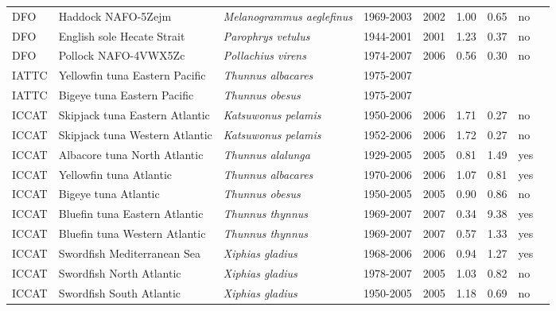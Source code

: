 \begin{longtable}{p{1.8cm}p{4cm}p{4cm}ccccp{1.9cm}c}
  DFO & Haddock NAFO-5Zejm & \textit{Melanogrammus aeglefinus} & 1969-2003 & 2002 & 1.00 & 0.65 & no & \cite{NAFO-HAD5Zejm-2003.pdf} \\ 
  DFO & English sole Hecate Strait & \textit{Parophrys vetulus} & 1944-2001 & 2001 & 1.23 & 0.37 & no & \cite{Flat99.pdf} \\ 
  DFO & Pollock NAFO-4VWX5Zc & \textit{Pollachius virens} & 1974-2007 & 2006 & 0.56 & 0.30 & no & \cite{NAFO-POLL4VWX5Zc-2006.pdf} \\ 
  IATTC & Yellowfin tuna Eastern Pacific & \textit{Thunnus albacares} & 1975-2007 &  &  &  &  & \cite{SAR8-YFT-ENG.pdf} \\ 
  IATTC & Bigeye tuna Eastern Pacific & \textit{Thunnus obesus} & 1975-2007 &  &  &  &  & \cite{JENSEN_BETEPAC_2008.pdf} \\ 
  ICCAT & Skipjack tuna Eastern Atlantic & \textit{Katsuwonus pelamis} & 1950-2006 & 2006 & 1.71 & 0.27 & no & \cite{JENSEN_YFINATL-2008.pdf} \\ 
  ICCAT & Skipjack tuna Western Atlantic & \textit{Katsuwonus pelamis} & 1952-2006 & 2006 & 1.72 & 0.27 & no & \cite{JENSEN_YFINATL-2008.pdf} \\ 
  ICCAT & Albacore tuna North Atlantic & \textit{Thunnus alalunga} & 1929-2005 & 2005 & 0.81 & 1.49 & yes & \cite{2007-ALB-STOCK-ASSESS-REP.pdf} \\ 
  ICCAT & Yellowfin tuna Atlantic & \textit{Thunnus albacares} & 1970-2006 & 2006 & 1.07 & 0.81 & yes & \cite{JENSEN-YFINATL-2008.pdf} \\ 
  ICCAT & Bigeye tuna Atlantic & \textit{Thunnus obesus} & 1950-2005 & 2005 & 0.90 & 0.86 & no & \cite{JENSEN-BIGEYEATL-2008.pdf} \\ 
  ICCAT & Bluefin tuna Eastern Atlantic & \textit{Thunnus thynnus} & 1969-2007 & 2007 & 0.34 & 9.38 & yes & \cite{ref2008-BFT-STOCK-ASSESS-REP.pdf} \\ 
  ICCAT & Bluefin tuna Western Atlantic & \textit{Thunnus thynnus} & 1969-2007 & 2007 & 0.57 & 1.33 & yes & \cite{ref2008-BFT-STOCK-ASSESS-REP.pdf} \\ 
  ICCAT & Swordfish Mediterranean Sea & \textit{Xiphias gladius} & 1968-2006 & 2006 & 0.94 & 1.27 & yes & \cite{ICCAT-Mediterranean-Xiphiasgladius-2007.pdf} \\ 
  ICCAT & Swordfish North Atlantic & \textit{Xiphias gladius} & 1978-2007 & 2005 & 1.03 & 0.82 & no & \cite{JENSEN_SWORDSATL-2007.pdf} \\ 
  ICCAT & Swordfish South Atlantic & \textit{Xiphias gladius} & 1950-2005 & 2005 & 1.18 & 0.69 & no & \cite{JENSEN_SWORDSATL-2007.pdf} \\ 

\end{longtable}
